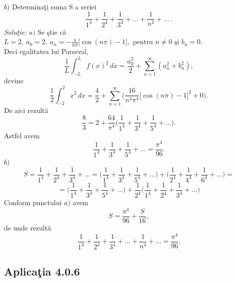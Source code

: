\documentclass[a4paper,openany,12pt]{report}
\begin{document}
\paragraph*{}$b)$ Determina\c ti suma S a seriei 
\begin{equation*}
\frac{1}{1^4}+\frac{1}{2^4}+\frac{1}{3^4}+...+\frac{1}{n^4}+...\:.
\end{equation*}
\textit{Solu\c tie:}
\newline
$a)$ Se \c stie c\u a $L=2,\: a_0=2, \: a_n=-\frac{4}{n\pi}\Big[\cos(n\pi)-1\Big],\text{ pentru }n \neq 0\text{ \c si } b_n=0.$\\
Deci egalitatea lui Parseval,
\begin{equation*}
\frac{1}{L}\int_{-L}^L f(x)^2 \, dx = \frac{a_0^2}{2}+\sum_{n=1}^\infty(a_n^2+b_n^2),
\end{equation*}
devine
\begin{equation*}
\frac{1}{2}\int_{-2}^2 x^2 \, dx = \frac{4}{2}+\sum_{n=1}^\infty\bigg(\frac{16}{n^4\pi^4}\Big[\cos(n\pi)-1\Big]^2+0\bigg).
\end{equation*}
De aici rezult\u a 
\begin{equation*}
\frac{8}{3}=2+\frac{64}{\pi^4}\bigg(\frac{1}{1^4}+\frac{1}{3^4}+\frac{1}{5^4}+...\bigg).
\end{equation*}
Astfel avem 
\begin{equation*}
\frac{1}{1^4}+\frac{1}{3^4}+\frac{1}{5^4}+... = \frac{\pi^4}{96}.
\end{equation*}
\newline
$b)$
\begin{equation*}
S=\frac{1}{1^4}+\frac{1}{2^4}+\frac{1}{3^4}+... = \bigg(\frac{1}{1^4}+\frac{1}{3^4}+\frac{1}{5^4}+... \bigg)+\bigg(\frac{1}{2^4}+\frac{1}{4^4}+\frac{1}{6^4}+...\bigg)=
\end{equation*}
\begin{equation*}
=\bigg(\frac{1}{1^4}+\frac{1}{3^4}+\frac{1}{5^4}+...\bigg)+ \frac{1}{2^4}\bigg(\frac{1}{1^4}+\frac{1}{2^4}+\frac{1}{3^4}+...\bigg)
\end{equation*}
Conform punctului $a)$ avem
\begin{equation*}
S=\frac{\pi^4}{96}+\frac{S}{16},
\end{equation*}
de unde rezult\u a
\begin{equation*}
\frac{1}{1^4}+\frac{1}{2^4}+\frac{1}{3^4}+...+\frac{1}{n^4}+...=\frac{\pi^4}{96}.
\end{equation*}




\subsection*{Aplica\c tia 4.0.6}
\end{document}
